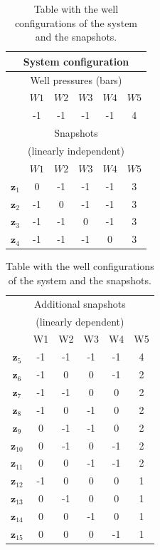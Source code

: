 \documentclass[review]{elsarticle}
\begin{document}
\begin{table}[!ht]\centering
\begin{minipage}{.45\textwidth}
\vspace{-10pt}
\centering
\begin{tabular}{ |c|c|c|c|c|c|} 
 \hline
  \multicolumn{6}{|c|}{System configuration} \\ 
  \hline
  \multicolumn{6}{|c|}{Well pressures (bars)}\\
  \hline
  &$W1$ &$W2$ &$W3$ &$W4$ &$W5$ \\
  \hline
&-1 & -1& -1& -1& 4\\
\hline
\multicolumn{6}{|c|}{Snapshots } \\
\multicolumn{6}{|c|}{ (linearly independent)} \\
\hline
 &$W1$ &$W2$ &$W3$ &$W4$ &$W5$ \\
  \hline

$\mathbf{z}_1$& 0&-1 &-1 &-1 &3 \\
$\mathbf{z}_2$& -1&0 &-1 &-1 &3  \\
$\mathbf{z}_3$& -1&-1 &0 &-1 &3  \\
$\mathbf{z}_4$& -1&-1 &-1 &0 &3  \\
 \hline
 \end{tabular}
\label{table:case2}\end{minipage}%
\hspace{15pt}
 \begin{minipage}{.45\textwidth}
 \begin{tabular}{ |c|c|c|c|c|c|} 
 \hline
 \multicolumn{6}{|c|}{Additional snapshots} \\
 \multicolumn{6}{|c|}{ (linearly dependent)} \\
\hline
 &W1 &W2 &W3 &W4 &W5 \\
  \hline
$\mathbf{z}_5$& -1&-1 &-1 &-1 &4  \\
$\mathbf{z}_6$& -1&0 &0 &-1 &2  \\
$\mathbf{z}_7$& -1&-1 &0 &0 &2  \\
$\mathbf{z}_8$& -1&0 &-1 &0 &2  \\
$\mathbf{z}_9$& 0&-1 &-1 &0 &2  \\
$\mathbf{z}_{10}$& 0&-1 &0 &-1 &2  \\
$\mathbf{z}_{11}$& 0&0 &-1 &-1 &2  \\
$\mathbf{z}_{12}$& -1&0 &0 &0 &1  \\
$\mathbf{z}_{13}$& 0&-1 &0 &0 &1  \\
$\mathbf{z}_{14}$& 0&0 &-1 &0 &1  \\
$\mathbf{z}_{15}$& 0&0 &0 &-1 &1  \\
 \hline
 \end{tabular}

\end{minipage}\caption{Table with the well configurations of the system and the snapshots.}
\vspace{-10pt}\label{table:sc}
\end{table}
\end{document}
